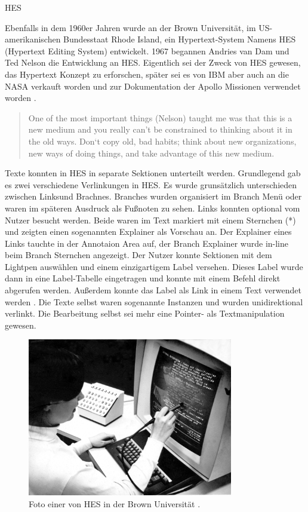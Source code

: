 \begin{section}{HES}
\label{sec:hes}

Ebenfalls in dem 1960er Jahren wurde an der Brown Universität, im US-amerikanischen Bundesstaat Rhode Island, ein Hypertext-System Namens \glqq HES\grqq{ } (Hypertext Editing System) entwickelt. 1967 begannen Andries van Dam und Ted Nelson die Entwicklung an HES. Eigentlich sei der Zweck von HES gewesen, das Hypertext Konzept zu erforschen, später sei es von IBM aber auch an die NASA verkauft worden und zur Dokumentation der Apollo Missionen verwendet worden \cite{Dam1988}.

\begin{quote}
\glqq One of the most important things (Nelson) taught me was that this is a new medium and you really can’t be constrained to thinking about it in the old ways. Don‘t copy old, bad habits; think about new organizations, new ways of doing things, and take advantage of this new medium.\grqq{ }\cite{Dam1988}
\end{quote}

Texte konnten in HES in separate Sektionen unterteilt werden. Grundlegend gab es zwei verschiedene Verlinkungen in HES. Es wurde grunsätzlich unterschieden zwischen \glqq Links\grqq{ }und \glqq Brachnes\grqq{ }. Branches wurden organisiert im Branch Menü oder waren im späteren Ausdruck als Fußnoten zu sehen. Links konnten optional vom Nutzer besucht werden. Beide waren im Text markiert mit einem Sternchen (*) und zeigten einen sogenannten Explainer als Vorschau an. Der Explainer eines Links tauchte in der Annotaion Area auf, der Branch Explainer wurde in-line beim Branch Sternchen angezeigt. Der Nutzer konnte Sektionen mit dem Lightpen auswählen und einem einzigartigem Label versehen. Dieses Label wurde dann in eine Label-Tabelle eingetragen und konnte mit einem Befehl direkt abgerufen werden. Außerdem konnte das Label als Link in einem Text verwendet werden \cite{Dam1969}. Die Texte selbst waren sogenannte Instanzen und wurden unidirektional verlinkt. \glqq Die Bearbeitung selbst sei mehr eine Pointer- als Textmanipulation gewesen\grqq{ }\cite[S. 890]{Dam1988}.

\begin{figure}[H]
	\centering
	\includegraphics[width=0.8\textwidth]{image/hes}
	\caption{Foto einer von HES in der Brown Universität \cite{Lloyd1969}.}
	\label{fig:hes}
\end{figure}


\end{section}
